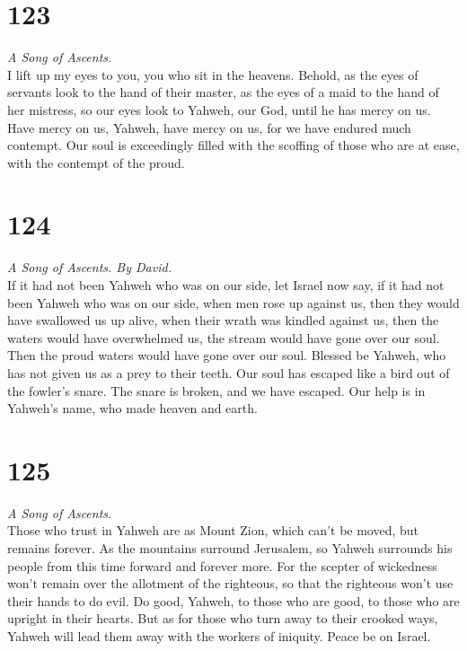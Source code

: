 \hypertarget{section-122}{%
\section{123}\label{section-122}}

\emph{A Song of Ascents.}\\
 I lift up my eyes to you, you who sit in the heavens.
 Behold, as the eyes of servants look to the hand of their
master, as the eyes of a maid to the hand of her mistress, so our eyes
look to Yahweh, our God, until he has mercy on us.  Have
mercy on us, Yahweh, have mercy on us, for we have endured much
contempt.  Our soul is exceedingly filled with the
scoffing of those who are at ease, with the contempt of the proud.

\hypertarget{section-123}{%
\section{124}\label{section-123}}

\emph{A Song of Ascents. By David.}\\
 If it had not been Yahweh who was on our side, let Israel
now say,  if it had not been Yahweh who was on our side,
when men rose up against us,  then they would have
swallowed us up alive, when their wrath was kindled against us,
 then the waters would have overwhelmed us, the stream
would have gone over our soul.  Then the proud waters
would have gone over our soul.  Blessed be Yahweh, who has
not given us as a prey to their teeth.  Our soul has
escaped like a bird out of the fowler's snare. The snare is broken, and
we have escaped.  Our help is in Yahweh's name, who made
heaven and earth.

\hypertarget{section-124}{%
\section{125}\label{section-124}}

\emph{A Song of Ascents.}\\
 Those who trust in Yahweh are as Mount Zion, which can't
be moved, but remains forever.  As the mountains surround
Jerusalem, so Yahweh surrounds his people from this time forward and
forever more.  For the scepter of wickedness won't remain
over the allotment of the righteous, so that the righteous won't use
their hands to do evil.  Do good, Yahweh, to those who are
good, to those who are upright in their hearts.  But as
for those who turn away to their crooked ways, Yahweh will lead them
away with the workers of iniquity. Peace be on Israel.

